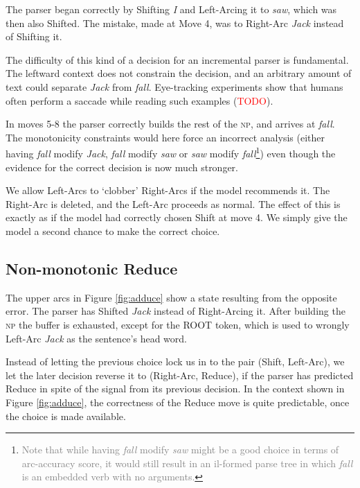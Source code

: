 \documentclass[11pt,letterpaper]{article}
\newcommand{\maybe}[1]{\textcolor{gray}{#1}}
\newcommand{\note}[1]{\textcolor{red}{#1}}
\begin{document}
The parser began correctly by Shifting \emph{I}
and Left-Arcing it to \emph{saw}, which was then also Shifted. The mistake, made
at Move 4, was to Right-Arc \emph{Jack} instead of Shifting it.

The difficulty of this kind of a decision for an incremental parser is fundamental.
The leftward context does not constrain the decision, 
and an arbitrary amount of text could separate \emph{Jack} from
\emph{fall}. Eye-tracking
experiments show that humans often perform a saccade while reading such
examples (\note{TODO}).

In moves 5-8 the parser correctly builds the rest of the \textsc{np}, and arrives
at \emph{fall}. The monotonicity constraints would here force an incorrect
analysis (either having \emph{fall} modify \emph{Jack}, \emph{fall} modify
\emph{saw} or \emph{saw} modify \emph{fall}\footnote{\maybe{Note that while having
\emph{fall} modify \emph{saw} might be a good choice in terms
of arc-accuracy score, it would still result in an il-formed parse tree in which
\emph{fall} is an embedded verb with no arguments.}})
even though the evidence for the correct decision is now much stronger.

We allow Left-Arcs to `clobber' Right-Arcs if the model
recommends it. The Right-Arc is deleted, and the Left-Arc proceeds as normal. The
effect of this is exactly as if the model had correctly chosen Shift at
move 4. We simply give the model a second chance to make the correct choice.

\subsection{Non-monotonic Reduce}

The upper arcs in Figure \ref{fig:adduce} show a state resulting from the opposite error.
The parser has Shifted \emph{Jack} instead of Right-Arcing it. After
building the \textsc{np} the buffer is exhausted, except for the ROOT token,
which is used to wrongly Left-Arc \emph{Jack} as the sentence's head word.

Instead of letting the previous choice lock us in to the pair (Shift, Left-Arc), we let
the later decision reverse it to (Right-Arc, Reduce), if the parser has predicted
Reduce in spite of the signal from its previous decision.
In the context shown in Figure \ref{fig:adduce}, the correctness of the Reduce
move is quite predictable, once the choice is made available.
\end{document}
